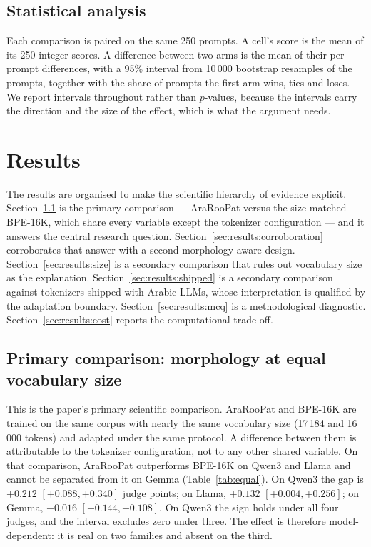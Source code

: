 \documentclass[a4paper,fleqn]{cas-sc}
\begin{document}
\subsection{Statistical analysis}
\label{sec:protocol:stats}

Each comparison is paired on the same 250 prompts. A cell's score is the mean of its 250 integer scores. A difference between two arms is the mean of their per-prompt differences, with a 95\% interval from 10\,000 bootstrap resamples of the prompts, together with the share of prompts the first arm wins, ties and loses. We report intervals throughout rather than $p$-values, because the intervals carry the direction and the size of the effect, which is what the argument needs.

\section{Results}
\label{sec:results}

The results are organised to make the scientific hierarchy of evidence explicit. Section~\ref{sec:results:morpho} is the primary comparison --- AraRooPat versus the size-matched BPE-16K, which share every variable except the tokenizer configuration --- and it answers the central research question. Section~\ref{sec:results:corroboration} corroborates that answer with a second morphology-aware design. Section~\ref{sec:results:size} is a secondary comparison that rules out vocabulary size as the explanation. Section~\ref{sec:results:shipped} is a secondary comparison against tokenizers shipped with Arabic LLMs, whose interpretation is qualified by the adaptation boundary. Section~\ref{sec:results:mcq} is a methodological diagnostic. Section~\ref{sec:results:cost} reports the computational trade-off.

\subsection{Primary comparison: morphology at equal vocabulary size}
\label{sec:results:morpho}

This is the paper's primary scientific comparison. AraRooPat and BPE-16K are trained on the same corpus with nearly the same vocabulary size (17\,184 and 16\,000 tokens) and adapted under the same protocol. A difference between them is attributable to the tokenizer configuration, not to any other shared variable. On that comparison, AraRooPat outperforms BPE-16K on Qwen3 and Llama and cannot be separated from it on Gemma (Table~\ref{tab:equal}). On Qwen3 the gap is $+0.212$ $[+0.088,+0.340]$ judge points; on Llama, $+0.132$ $[+0.004,+0.256]$; on Gemma, $-0.016$ $[-0.144,+0.108]$. On Qwen3 the sign holds under all four judges, and the interval excludes zero under three. The effect is therefore model-dependent: it is real on two families and absent on the third.
\end{document}
